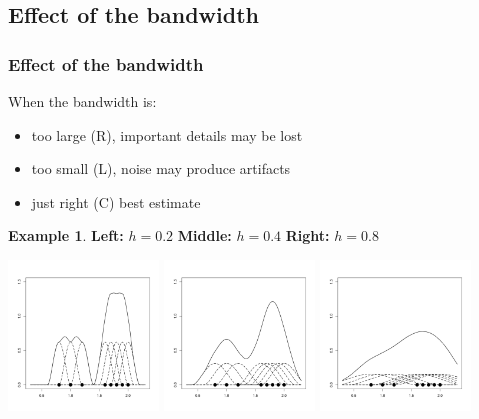 \documentclass[notheorems]{beamer}
\theoremstyle{definition}
\theoremstyle{example}
\newtheorem{example}{Example}
\begin{document}
\subsection{Effect of the bandwidth}
\begin{frame}\frametitle{Effect of the bandwidth}
    When the bandwidth is:
    \begin{itemize}
        \item too large (R), important details may be lost
        \item too small (L), noise may produce artifacts
        \item just right (C) best estimate
    \end{itemize}
    \begin{example}{\tiny{\textbf{Left:} $h=0.2$ \textbf{Middle:} $h=0.4$ \textbf{Right:} $h=0.8$ }}
    \centerline{
        \label{fig:points-and-dkd}
        \centering
        \includegraphics[width=0.3\textwidth]{kernel1d-02}
        \includegraphics[width=0.3\textwidth]{kernel1d-04}
        \includegraphics[width=0.3\textwidth]{kernel1d-08}
    }
    \end{example}
\end{frame}

\end{document}
